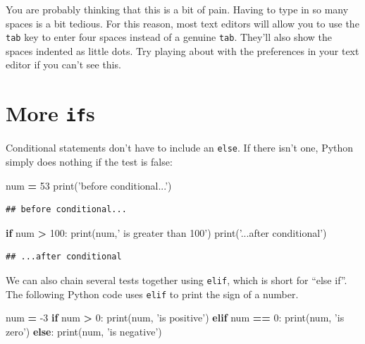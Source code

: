 \documentclass[]{book}
\newenvironment{Shaded}{\begin{snugshade}}{\end{snugshade}}
\newcommand{\BuiltInTok}[1]{#1}
\newcommand{\ControlFlowTok}[1]{\textcolor[rgb]{0.13,0.29,0.53}{\textbf{#1}}}
\newcommand{\DecValTok}[1]{\textcolor[rgb]{0.00,0.00,0.81}{#1}}
\newcommand{\NormalTok}[1]{#1}
\newcommand{\OperatorTok}[1]{\textcolor[rgb]{0.81,0.36,0.00}{\textbf{#1}}}
\newcommand{\StringTok}[1]{\textcolor[rgb]{0.31,0.60,0.02}{#1}}
\theoremstyle{definition}
\theoremstyle{definition}
\theoremstyle{definition}
\theoremstyle{remark}
\let\BeginKnitrBlock\begin \let\EndKnitrBlock\end
\begin{document}
\BeginKnitrBlock{reader}
You are probably thinking that this is a bit of pain. Having to type in
so many spaces is a bit tedious. For this reason, most text editors will
allow you to use the \texttt{tab} key to enter four spaces instead of a
genuine \texttt{tab}. They'll also show the spaces indented as little
dots. Try playing about with the preferences in your text editor if you
can't see this.
\EndKnitrBlock{reader}

\hypertarget{more-ifs}{%
\section{\texorpdfstring{More \texttt{if}s}{More ifs}}\label{more-ifs}}

Conditional statements don't have to include an \texttt{else}. If there
isn't one, Python simply does nothing if the test is false:

\begin{Shaded}
\begin{Highlighting}[]
\NormalTok{num }\OperatorTok{=} \DecValTok{53}
\BuiltInTok{print}\NormalTok{(}\StringTok{'before conditional...'}\NormalTok{)}
\end{Highlighting}
\end{Shaded}

\begin{verbatim}
## before conditional...
\end{verbatim}

\begin{Shaded}
\begin{Highlighting}[]
\ControlFlowTok{if}\NormalTok{ num }\OperatorTok{>} \DecValTok{100}\NormalTok{:}
    \BuiltInTok{print}\NormalTok{(num,}\StringTok{' is greater than 100'}\NormalTok{)}
\BuiltInTok{print}\NormalTok{(}\StringTok{'...after conditional'}\NormalTok{)}
\end{Highlighting}
\end{Shaded}

\begin{verbatim}
## ...after conditional
\end{verbatim}

We can also chain several tests together using \texttt{elif}, which is
short for ``else if''. The following Python code uses \texttt{elif} to
print the sign of a number.

\begin{Shaded}
\begin{Highlighting}[]
\NormalTok{num }\OperatorTok{=} \DecValTok{-3}
\ControlFlowTok{if}\NormalTok{ num }\OperatorTok{>} \DecValTok{0}\NormalTok{:}
    \BuiltInTok{print}\NormalTok{(num, }\StringTok{'is positive'}\NormalTok{)}
\ControlFlowTok{elif}\NormalTok{ num }\OperatorTok{==} \DecValTok{0}\NormalTok{:}
    \BuiltInTok{print}\NormalTok{(num, }\StringTok{'is zero'}\NormalTok{)}
\ControlFlowTok{else}\NormalTok{:}
    \BuiltInTok{print}\NormalTok{(num, }\StringTok{'is negative'}\NormalTok{)}
\end{Highlighting}
\end{Shaded}
\end{document}

